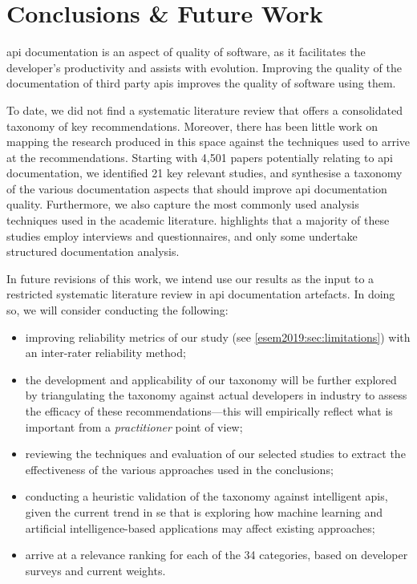 \section{Conclusions \& Future Work}
\label{esem2019:sec:conclusions}

\gls{api} documentation is an aspect of quality of software, as it facilitates the developer's productivity and assists with evolution. Improving the quality of the documentation of third party \glspl{api} improves the quality of software using them.

To date, we did not find a systematic literature review that offers a consolidated taxonomy of key recommendations. Moreover, there has been little work on mapping the research produced in this space against the techniques used to arrive at the recommendations.
Starting with 4,501 papers potentially relating to \gls{api} documentation, we identified 21 key relevant studies, and synthesise a taxonomy of the various documentation aspects that should improve \gls{api} documentation quality. Furthermore, we also capture the most commonly used analysis techniques used in the academic literature.  highlights that a majority of these studies employ interviews and questionnaires, and only some undertake structured documentation analysis. 

In future revisions of this work, we intend use our results as the input to a restricted systematic literature review in \gls{api} documentation artefacts. In doing so, we will consider conducting the following:

\begin{itemize}
  \item improving reliability metrics of our study (see \cref{esem2019:sec:limitations}) with an inter-rater reliability method;
  \item the development and applicability of our taxonomy will be further explored by triangulating the taxonomy  against actual developers in industry to assess the efficacy of these recommendations---this will empirically reflect what is important from a \textit{practitioner} point of view;
  \item reviewing the techniques and evaluation of our selected studies to extract the effectiveness of the various approaches used in the conclusions;
  \item conducting a heuristic validation of the taxonomy against intelligent \glspl{api}, given the current trend in \gls{se} that is exploring how machine learning and artificial intelligence-based applications may affect existing approaches;
  \item  arrive at a relevance ranking for each of the 34 categories, based on developer surveys and current weights.
\end{itemize}


